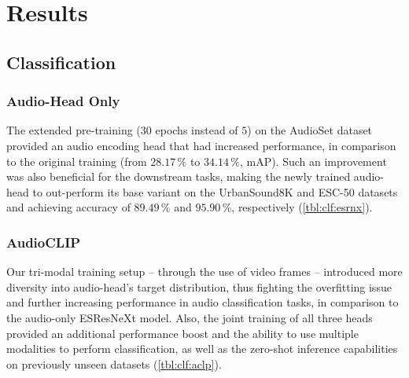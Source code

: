 \documentclass[runningheads]{llncs}
\begin{document}
\section{Results} \label{sec:results}

\subsection{Classification} \label{sec:results:clf}

\subsubsection{Audio-Head Only} \label{sec:results:clf:ah}

The extended pre-training ($30$ epochs instead of $5$) on the \mbox{AudioSet} dataset provided an audio encoding head that had increased performance, in comparison to the original training (from $28.17\,\%$ to $34.14\,\%$, mAP).
Such an improvement was also beneficial for the downstream tasks, making the newly trained audio-head to out-perform its base variant on the \mbox{UrbanSound8K} and \mbox{ESC-50} datasets and achieving accuracy of $89.49\,\%$ and $95.90\,\%$, respectively (\autoref{tbl:clf:esrnx}).

\subsubsection{AudioCLIP} \label{sec:results:clf:audioclip}

Our tri-modal training setup -- through the use of video frames -- introduced more diversity into audio-head's target distribution, thus fighting the overfitting issue and further increasing performance in audio classification tasks, in comparison to the audio-only \mbox{ESResNeXt} model.
Also, the joint training of all three heads provided an additional performance boost and the ability to use multiple modalities to perform classification, as well as the zero-shot inference capabilities on previously unseen datasets (\autoref{tbl:clf:aclp}).
\end{document}
